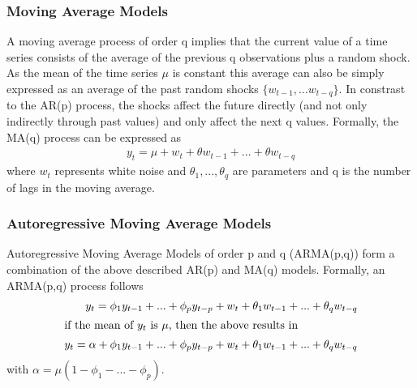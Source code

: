 \subsubsection{Moving Average Models}
A moving average process of order q implies that the current value of a time series consists of the average of the previous q observations plus a random shock. As the mean of the time series $\mu$ is constant this average can also be simply expressed as an average of the past random shocks $\{w_{t-1}, ... w_{t-q}\} $. In constrast to the AR(p) process, the shocks affect the future directly (and not only indirectly through past values) and only affect the next q values. Formally, the MA(q) process can be expressed as
\begin{align}
    y_t = \mu + w_t + \theta w_{t-1} + ... + \theta w_{t-q}
\end{align}{}
\noindent where $w_t$ represents white noise and $\theta_1, ..., \theta_q$ are parameters and q is the number of lags in the moving average. 


\subsubsection{Autoregressive Moving Average Models}
Autoregressive Moving Average Models of order p and q (ARMA(p,q)) form a combination of the above described AR(p) and MA(q) models. Formally, an ARMA(p,q) process follows
\begin{align}
    y_t = \phi_1 y_{t-1} + ... + \phi_p y_{t-p} + w_t + \theta_1 w_{t-1} + ... + \theta_q w_{t-q} \\
    \intertext{if the mean of $y_t$ is $\mu$, then the above results in}
    y_t = \alpha + \phi_1 y_{t-1} + ... + \phi_p y_{t-p} + w_t + \theta_1 w_{t-1} + ... + \theta_q w_{t-q}
\end{align}
\noindent with $\alpha = \mu (1 - \phi_1 - ... - \phi_p)$.


